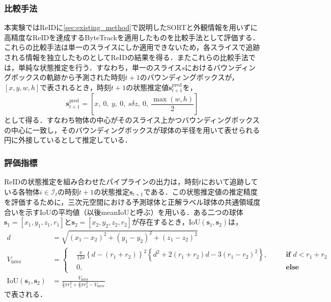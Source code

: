     \subsubsection{比較手法}
    本実験ではReIDに\ref{sec:existing_method}で説明したSORTと外観情報を用いずに高精度なReIDを達成するByteTrackを適用したものを比較手法として評価する．これらの比較手法は単一のスライスにしか適用できないため，各スライスで追跡される情報を独立したものとしてReIDの結果を得る．またこれらの比較手法では，単純な状態推定を行う．すなわち，単一のスライス$s$におけるバウンディングボックスの軌跡から予測された時刻$t + 1$のバウンディングボックスが，$[x, y, w, h]$で表されるとき，時刻$t+1$の状態推定値$\bm{s}_{t+1}^{\text{pred}}$を，
    \begin{equation}
        \label{eq:naive_state_estimation}
        \bm{s}^{\text{pred}}_{t+1} = \left[x,~ 0,~ y,~ 0,~ s \delta z,~ 0,~ \frac{\max(w, h)}{2}\right]
    \end{equation}
    として得る．すなわち物体の中心がそのスライス上かつバウンディングボックスの中心に一致し，そのバウンディングボックスが球体の半径を用いて表せられる円に外接しているとして推定している．
    
    \subsubsection{評価指標}
    
    ReIDの状態推定を組み合わせたパイプラインの出力は，時刻$t$において追跡している各物体$i \in \mathcal{I}_t$の時刻$t+1$の状態推定$\bm{s}_{t+1}$である．この状態推定値の推定精度を評価するために，三次元空間における予測球体と正解ラベル球体の共通領域度合いを示すIoUの平均値（以後meanIoUと呼ぶ）を用いる．ある二つの球体$\bm{s}_1 = [x_1, y_1, z_1, r_1]$と$\bm{s}_2 = [x_2, y_2, z_2, r_2]$が存在するとき，IoU$(\bm{s}_1, \bm{s}_2)$は，
    \begin{equation}
        \label{eq:sphere_iou}
        \begin{aligned}
            d &= \sqrt{(x_1 - x_2)^2 + (y_1 - y_2)^2 + (z_1 - z_2)^2}
            \\V_{\text{inter}} &= \left\{
                \begin{aligned}
                    &\frac{\pi}{12 d} \left\{d - (r_1 + r_2)\right\}^2 \left\{d^2 + 2(r_1 + r_2)d - 3 (r_1 - r_2)^2\right\},& \quad &\textbf{if } d < r_1 + r_2
                    \\ & 0,& &\textbf{else} 
                \end{aligned}
            \right.
            \\\text{IoU}(\bm{s}_1, \bm{s}_2) &= \frac{V_{\text{inter}}}{\frac{4}{3}\pi r_1^2 + \frac{4}{3}\pi r_2^2 - V_{\text{inter}}}
        \end{aligned}
    \end{equation}
    で表される．


